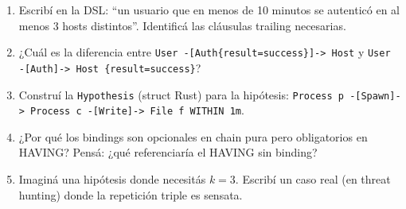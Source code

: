 \begin{ejercicios}
\begin{enumerate}
    \item \starred{} Escribí en la DSL: ``un usuario que en menos
    de 10 minutos se autenticó en al menos 3 hosts distintos''.
    Identificá las cláusulas trailing necesarias.

    \item ¿Cuál es la diferencia entre
    \texttt{User -[Auth\{result=success\}]-> Host} y
    \texttt{User -[Auth]-> Host \{result=success\}}?

    \item \starred{} Construí la \texttt{Hypothesis} (struct Rust)
    para la hipótesis: \texttt{Process p -[Spawn]-> Process c -[Write]-> File f WITHIN 1m}.

    \item ¿Por qué los bindings son opcionales en chain pura pero
    obligatorios en HAVING? Pensá: ¿qué referenciaría el HAVING
    sin binding?

    \item Imaginá una hipótesis donde necesitás \(k=3\). Escribí
    un caso real (en threat hunting) donde la repetición triple es
    sensata.
\end{enumerate}
\end{ejercicios}

